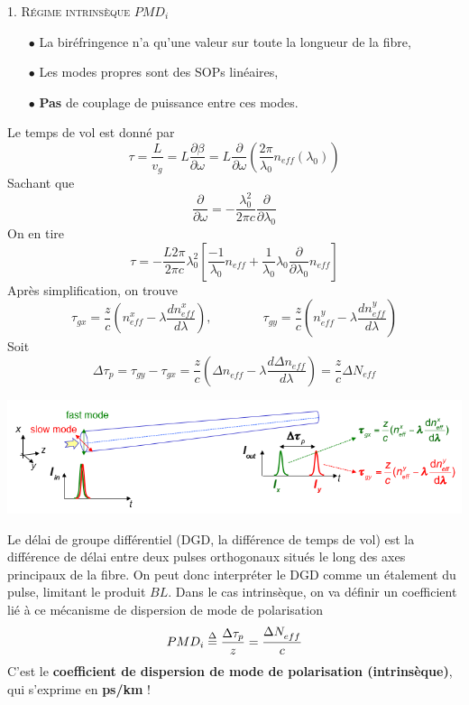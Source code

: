 \textsc{1. Régime intrinsèque $PMD_i$}\\
\begin{itemize}
\item[$\bullet$] La biréfringence n'a qu'une valeur sur toute la longueur de la fibre,
\item[$\bullet$] Les modes propres sont des SOPs linéaires,
\item[$\bullet$] \textbf{Pas} de couplage de puissance entre ces modes.
\end{itemize}
Le temps de vol est donné par
\begin{equation}
\tau = \frac{L}{v_g} =  L \frac{\partial \beta}{\partial \omega} = L 
\frac{\partial}{\partial \omega}\left(\frac{2\pi}{\lambda_0}n_{eff}(\lambda_0)\right)
\end{equation}
Sachant que
\begin{equation}
\dfrac{\partial}{\partial\omega} = -\frac{\lambda_0^2}{2\pi c}\dfrac{\partial}{\partial\lambda_0}
\end{equation}
On en tire
\begin{equation}
\tau = -\frac{L 2\pi}{2\pi c}\lambda_0^2\left[ \frac{-1}{\lambda_0}n_{eff} + \frac{1}{\lambda_0}
\lambda_0\frac{\partial}{\partial\lambda_0}n_{eff}\right]
\end{equation}
Après simplification, on trouve
\begin{equation}
{\tau _{gx}} = \frac{z}{c}(n_{eff}^x - \lambda \frac{{dn_{eff}^x}}{{d\lambda }}),\qquad\qquad
{\tau _{gy}} = \frac{z}{c}(n_{eff}^y - \lambda \frac{{dn_{eff}^y}}{{d\lambda }})
\end{equation}
Soit
\begin{equation}
\Delta {\tau _p} = {\tau _{gy}} - {\tau _{gx}} = \frac{z}{c}(\Delta n_{eff}^{} - \lambda \frac{{d\Delta n_{eff}^{}}}{{d\lambda }}) = \frac{z}{c}\Delta {N_{eff}}
\end{equation}

\begin{center}
	\includegraphics[scale=0.64]{ch1/image49}
\end{center}

Le délai de groupe différentiel (DGD, la différence de temps de vol) est la différence de délai entre
deux pulses orthogonaux situés le long des axes principaux de la fibre. On peut donc interpréter
le DGD comme un étalement du pulse, limitant le produit $BL$. Dans le cas intrinsèque, on va 
définir un coefficient lié à ce mécanisme de dispersion de mode de polarisation
\begin{equation}
PM{D_i} \buildrel \Delta \over = \frac{{\Delta {\tau _p}}}{z} = \frac{{\Delta N_{eff}^{}}}{c}
\end{equation}
C'est le \textbf{coefficient de dispersion de mode de polarisation (intrinsèque)}, qui s'exprime
en \textbf{ps/km} !\\


